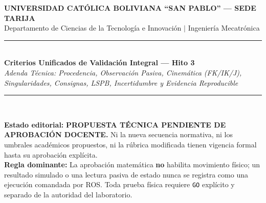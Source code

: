\documentclass[10pt, a4paper]{article}
\begin{document}
\begin{titlepage}
    \centering
    \vspace*{1.2cm}
    {\Large\textbf{\textcolor{ucbblue}{UNIVERSIDAD CATÓLICA BOLIVIANA ``SAN PABLO'' — SEDE TARIJA}}\\[0.2cm]
    \normalsize Departamento de Ciencias de la Tecnología e Innovación $\mid$ Ingeniería Mecatrónica}\\[1.4cm]

    \rule{\textwidth}{1.5pt}\\[0.5cm]
    {\LARGE\textbf{\textcolor{ucbblue}{Criterios Unificados de Validación Integral — Hito 3}}}\\[0.3cm]
    {\large\textit{Adenda Técnica: Procedencia, Observación Pasiva, Cinemática (FK/IK/J), Singularidades, Consignas, LSPB, Incertidumbre y Evidencia Reproducible}}\\[0.4cm]
    \rule{\textwidth}{1.5pt}\\[1.2cm]

    \begin{tcolorbox}[colback=red!5, colframe=red!80!black, title=\textbf{ESTADO DE APROBACIÓN Y REGLA DOMINANTE}, left=3mm, right=3mm, top=2mm, bottom=2mm]
        \small\raggedright
        \textbf{Estado editorial:} \textbf{PROPUESTA TÉCNICA PENDIENTE DE APROBACIÓN DOCENTE.} Ni la nueva secuencia normativa, ni los umbrales académicos propuestos, ni la rúbrica modificada tienen vigencia formal hasta su aprobación explícita.\\[0.2cm]
        \textbf{Regla dominante:} La aprobación matemática \textbf{no} habilita movimiento físico; un resultado simulado o una lectura pasiva de estado nunca se registra como una ejecución comandada por ROS. Toda prueba física requiere \texttt{GO} explícito y separado de la autoridad del laboratorio.
    \end{tcolorbox}


\end{titlepage}
\end{document}
